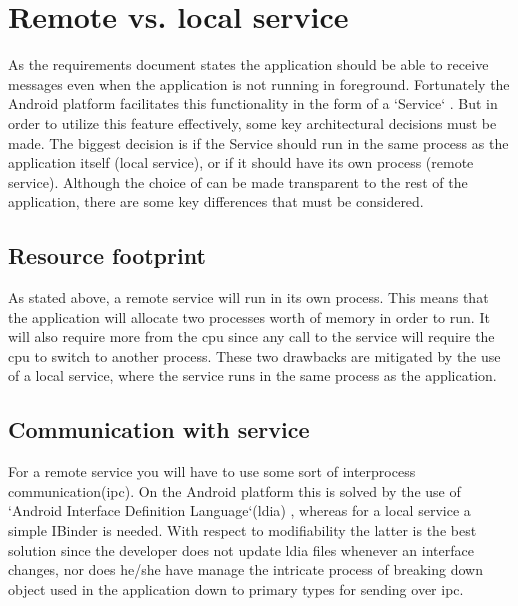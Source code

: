 

\section{Remote vs. local service}

As the requirements document states the application should be able to receive messages even when the application is not running in foreground. Fortunately the Android platform facilitates this functionality in the form of a `Service` \cite{bib:service}. But in order to utilize this feature effectively, some key architectural decisions must be made. The biggest decision is if the Service should run in the same process as the application itself (local service), or if it should have its own process (remote service). Although the choice of can be made transparent to the rest of the application, there are some key differences that must be considered.

\newpage

\subsection{Resource footprint}
As stated above, a remote service will run in its own process. This means that the application will allocate two processes worth of memory in order to run. It will also require more from the \gls{cpu} since any call to the service will require the \gls{cpu} to switch to another process. These two drawbacks are mitigated by the use of a local service, where the service runs in the same process as the application. 

\subsection{Communication with service}
For a remote service you will have to use some sort of  interprocess communication(\gls{ipc}). On the Android platform this is solved by the use of `Android Interface Definition Language`(\gls{ldia}) \cite{bib:aidl}, whereas for a local service a simple IBinder \cite{bib:ibinder} is needed. With respect to modifiability the latter is the best solution since the developer does not update \gls{ldia} files whenever an interface changes, nor does he/she have manage the intricate process of breaking down object used in the application down to primary types for sending over \gls{ipc}.





